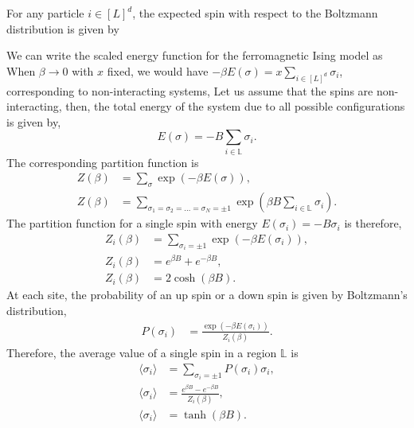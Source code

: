 \documentclass[letterpaper,english,10pt]{article}
\begin{document}
\begin{defn} 
 For any particle $i \in [L]^d$, the expected spin with respect to the Boltzmann distribution is given by 
 \end{defn}
 We can write the scaled energy function for the ferromagnetic Ising model as
When $\beta \to 0$ with $x$ fixed, we would have $-\beta E(\sigma) = x \sum_{i\in [L]^d}\sigma_{i}$, 
corresponding to non-interacting systems, 
Let us assume that the spins are non-interacting, then, the total energy of the system due to all possible configurations is given by,
\begin{equation}
E(\sigma) = - B \sum_{i\in \mathbb{L}}\sigma_{i}.
\end{equation}
The corresponding partition function is
\begin{align}
Z(\beta) &= \sum_{\sigma}\exp(-\beta E(\sigma)),\nonumber\\  
Z(\beta) &= \sum_{\sigma_{1}=\sigma_{2}=\ldots=\sigma_{N} = \pm 1}\exp(\beta B \sum_{i\in \mathbb{L}}\sigma_{i}).
\end{align}
The partition function for a single spin with energy            $E(\sigma_{i}) = -B\sigma_{i}$ is therefore,
\begin{align}
Z_{i}(\beta) &= \sum_{\sigma_{i} = \pm 1}\exp(-\beta E(\sigma_{i})),\nonumber\\  
Z_{i}(\beta) &= e^{\beta B}+ e^{-\beta B},\nonumber\\
Z_{i}(\beta) &= 2\cosh(\beta B).
\end{align}
At each site, the probability of an up spin or a down spin is given by Boltzmann's distribution,
\begin{align}
P(\sigma_{i}) &= \frac{\exp(-\beta E(\sigma_{i}))}{Z_{i}(\beta)}.
\end{align}
Therefore, the average value of a single spin in a region $\mathbb{L}$ is
\begin{align}
\langle\sigma_{i}\rangle &= \sum_{\sigma_{i}=\pm 1}P(\sigma_{i})\sigma_{i},\nonumber\\
\langle\sigma_{i}\rangle &= \frac{e^{\beta B}-e^{-\beta B}}{Z_{i}(\beta)},\nonumber\\
 \langle\sigma_{i}\rangle &= \tanh(\beta B).
\end{align}
\end{document}
